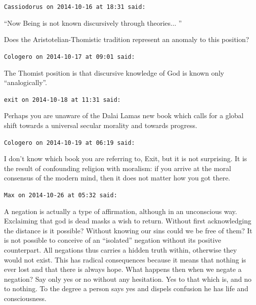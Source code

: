 \begin{footnotesize}
\begin{sffamily}
\hfill

\texttt{Cassiodorus on 2014-10-16 at 18:31 said:}

``Now Being is not known discursively through theories... ''

Does the Aristotelian-Thomistic tradition represent an anomaly to this position?

\hfill

\texttt{Cologero on 2014-10-17 at 09:01 said:}

The Thomist position is that discursive knowledge of God is known only ``analogically''.

\hfill

\texttt{exit on 2014-10-18 at 11:31 said:}

Perhaps you are unaware of the Dalai Lamas new book which calls for a global shift towards a universal secular morality and towards progress.

\hfill

\texttt{Cologero on 2014-10-19 at 06:19 said:}

I don't know which book you are referring to, Exit, but it is not surprising. It is the result of confounding religion with moralism: if you arrive at the moral consensus of the modern mind, then it does not matter how you got there.

\hfill

\texttt{Max on 2014-10-26 at 05:32 said:}

A negation is actually a type of affirmation, although in an unconscious way. Exclaiming that god is dead masks a wish to return. Without first acknowledging the distance is it possible? Without knowing our sins could we be free of them? It is not possible to conceive of an ``isolated'' negation without its positive counterpart. All negations thus carries a hidden truth within, otherwise they would not exist. This has radical consequences because it means that nothing is ever lost and that there is always hope. What happens then when we negate a negation? Say only yes or no without any hesitation. Yes to that which is, and no to nothing. To the degree a person says yes and dispels confusion he has life and consciousness.

\hfill

\end{sffamily}
\end{footnotesize}

